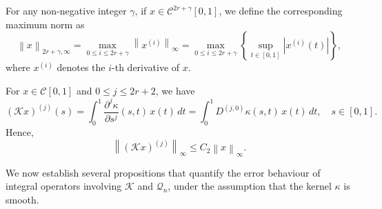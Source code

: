 \documentclass[]{interact}
\theoremstyle{plain}%
\theoremstyle{definition}
\theoremstyle{remark}
\newcommand{\norm}[1]{\left\lVert #1\right\rVert}
\begin{document}
\noindent
For any non-negative integer $\gamma$, if $x \in \mathcal{C}^{2r+\gamma}[0,1]$, we define the corresponding maximum norm as
\begin{equation*}
	\norm{x}_{2r+\gamma, \infty} 
	= \max_{0 \le i \le 2r+\gamma} 
	\norm{x^{(i)}}_\infty
	= \max_{0 \le i \le 2r+\gamma} 
	\left\{ \sup_{t \in [0,1]} \left|x^{(i)}(t)\right| \right\},
\end{equation*}
where $x^{(i)}$ denotes the $i$-th derivative of $x$. 

\noindent
For $x \in \mathcal{C}[0,1]$ and $0 \le j \le 2r+2$, we have
\[
(\mathcal{K}x)^{(j)}(s)
= \int_{0}^{1} \frac{\partial^{j} \kappa}{\partial s^j }(s,t)\, x(t)\, dt = \int_0^1 D^{(j,0)}\kappa(s,t)\, x(t)\, dt,
\quad s \in [0,1].
\]
Hence,
\begin{equation} \label{Eq:06}
	\norm{(\mathcal{K}x)^{(j)}}_{\infty} \le C_2 \norm{x}_\infty.
\end{equation}

We now establish several propositions that quantify the error behaviour of integral operators involving $\mathcal{K}$ and $\mathcal{Q}_n$, under the assumption that the kernel $\kappa$ is smooth.
\end{document}
